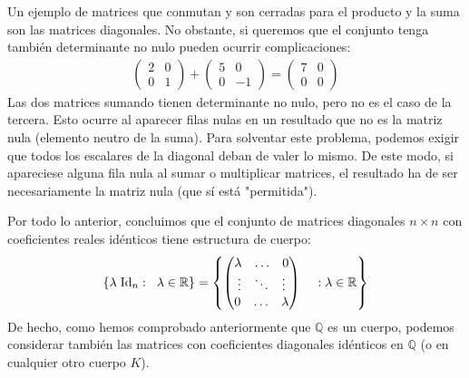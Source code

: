 \documentclass[12pt]{article}
\begin{document}
Un ejemplo de matrices que conmutan y son cerradas para el producto y la suma son las matrices diagonales. No obstante,
si queremos que el conjunto tenga también determinante no nulo pueden ocurrir complicaciones:
\begin{align*}
    \begin{pmatrix}2&0\\0&1\end{pmatrix} +
    \begin{pmatrix}5&0\\0&-1 \end{pmatrix} =
    \begin{pmatrix}7&0\\0&0\end{pmatrix}
\end{align*}
Las dos matrices sumando tienen determinante no nulo, pero no es el caso de la tercera.
Esto ocurre al aparecer filas nulas en un resultado que no es la matriz nula (elemento neutro de la suma).
Para solventar este problema, podemos exigir que todos los escalares de la diagonal deban de valer lo mismo.
De este modo, si apareciese alguna fila nula al sumar o multiplicar matrices, el resultado ha de ser necesariamente
la matriz nula (que sí está "permitida").

\newpage
Por todo lo anterior, concluimos que el conjunto de matrices diagonales $n\times n$ con coeficientes reales idénticos tiene estructura de cuerpo:
$$ \left\{\lambda \hspace{1mm} \text{Id}_n : \hspace{2mm}\lambda \in \mathbb{R} \right\}
= \left\{\begin{pmatrix}
    \lambda \hspace{3mm} \ldots \hspace{3mm} 0 \\
    \vdots \hspace{3mm} \ddots \hspace{3mm} \vdots \\
    0 \hspace{3mm} \ldots \hspace{3mm} \lambda
\end{pmatrix}\hspace{4mm} : \lambda \in \mathbb{R} \right\}$$
De hecho, como hemos comprobado anteriormente que $\mathbb{Q}$ es un cuerpo, podemos considerar también
las matrices con coeficientes diagonales idénticos en $\mathbb{Q}$ (o en cualquier otro cuerpo $K$).

\vspace{2mm}
\end{document}
